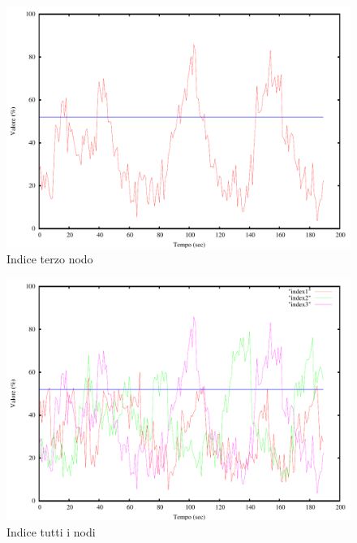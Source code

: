 \begin{figure}[H]
\begin{center}
\includegraphics[scale=0.6]{etc/index3.pdf}
\caption{Indice terzo nodo}
\label{fig:index3}
\end{center}
\end{figure}
\begin{figure}[H]
\begin{center}
\includegraphics[scale=0.6]{etc/index.pdf}
\caption{Indice tutti i nodi}
\label{fig:index}
\end{center}
\end{figure}